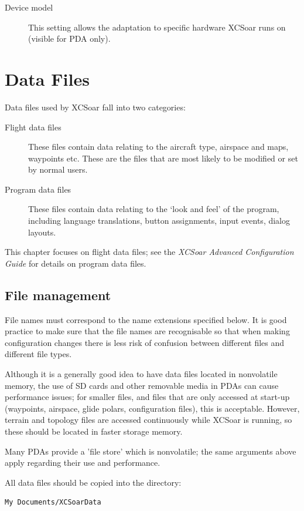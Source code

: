 \documentclass[a4paper,12pt]{refrep}
\begin{document}
\begin{description}
\item[Device model] This setting allows the adaptation to specific hardware
XCSoar runs on (visible for PDA only).
\end{description}

\chapter{Data Files}\label{cha:data-files}

Data files used by XCSoar fall into two categories:
\begin{description}
\item[Flight data files]  These files contain data relating to
the aircraft type, airspace and maps, waypoints etc.  These are the
files that are most likely to be modified or set by normal users.
\item[Program data files]  These files contain data relating to
the `look and feel' of the program, including language translations, 
button assignments, input events, dialog layouts.
\end{description}
This chapter focuses on flight data files; see the {\em XCSoar
Advanced Configuration Guide} for details on program data files.

\section{File management}

File names must correspond to the name extensions specified below.  It
is good practice to make sure that the file names are recognisable so
that when making configuration changes there is less risk of confusion
between different files and different file types.

Although it is a generally good idea to have data files located in
nonvolatile memory, the use of SD cards and other removable media in
PDAs can cause performance issues; for smaller files, and files that
are only accessed at start-up (waypoints, airspace, glide polars,
configuration files), this is acceptable.  However, terrain and
topology files are accessed continuously while XCSoar is running, so
these should be located in faster storage memory.

Many PDAs provide a 'file store' which is nonvolatile; the same
arguments above apply regarding their use and performance.

All data files should be copied into the directory:
\begin{verbatim}
My Documents/XCSoarData
\end{verbatim}
\end{document}
